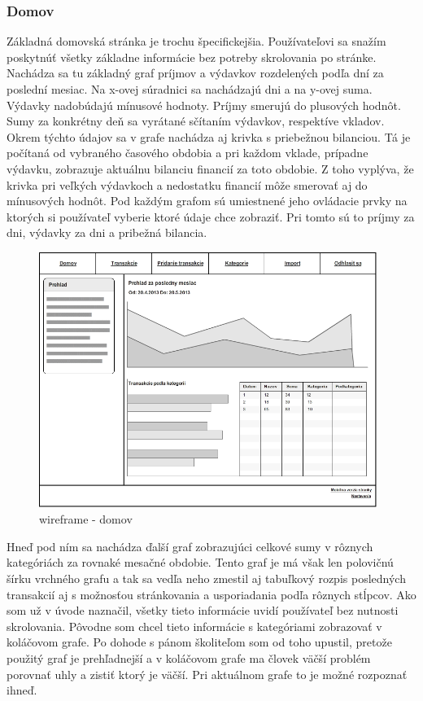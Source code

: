\documentclass[12pt,oneside]{book}
\begin{document}
\subsubsection{Domov}
Základná domovská stránka je trochu špecifickejšia. Používateľovi sa snažím poskytnúť všetky základne informácie bez potreby skrolovania po stránke. Nachádza sa tu základný graf príjmov a výdavkov rozdelených podľa dní za poslední mesiac. Na x-ovej súradnici sa nachádzajú dni a na y-ovej suma. Výdavky nadobúdajú mínusové hodnoty. Príjmy smerujú do plusových hodnôt. Sumy za konkrétny deň sa vyrátané sčítaním výdavkov, respektíve vkladov. Okrem týchto údajov sa v grafe nachádza aj krivka s priebežnou bilanciou. Tá je počítaná od vybraného časového obdobia a pri každom vklade, prípadne výdavku, zobrazuje aktuálnu bilanciu financií za toto obdobie. Z toho vyplýva, že krivka pri veľkých výdavkoch a nedostatku financií môže smerovať aj do mínusových hodnôt. Pod každým grafom sú umiestnené jeho ovládacie prvky na ktorých si používateľ vyberie ktoré údaje chce zobraziť. Pri tomto sú to príjmy za dni, výdavky za dni a pribežná bilancia.
\begin{figure}[ht]
  \centering
      \includegraphics[width=11cm]{wireframe_home}
  \caption{wireframe - domov}
  \label{wireframe - domov}
\end{figure}  

Hneď pod ním sa nachádza ďalší graf zobrazujúci celkové sumy v rôznych kategóriách za rovnaké mesačné obdobie. Tento graf je má však len polovičnú šírku vrchného grafu a tak sa vedľa neho zmestil aj tabuľkový rozpis posledných transakcií aj s možnosťou stránkovania a usporiadania podľa rôznych stĺpcov. Ako som už v úvode naznačil, všetky tieto informácie uvidí používateľ bez nutnosti skrolovania. Pôvodne som chcel tieto informácie s kategóriami zobrazovať v koláčovom grafe. Po dohode s pánom školiteľom som od toho upustil, pretože použitý graf je prehľadnejší a v koláčovom grafe ma človek väčší problém porovnať uhly a zistiť ktorý je väčší. Pri aktuálnom grafe to je možné rozpoznať ihneď.
\end{document}
